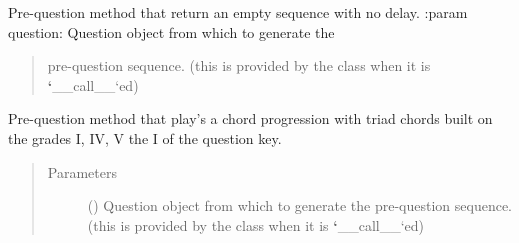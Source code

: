 \documentclass[letterpaper,10pt,english]{sphinxmanual}
\begin{document}

\begin{fulllineitems}
\label{\detokenize{birdears:birdears.prequestion.none}}
Pre-question method that return an empty sequence with no delay.
:param question: Question object from which to generate the
\begin{quote}

pre-question sequence. (this is provided by the  class
when it is {\color{red}\bfseries{}{}`}\_\_call\_\_{}`ed)
\end{quote}
\begin{quote}\begin{description}
\end{description}\end{quote}

\end{fulllineitems}


\begin{fulllineitems}
\label{\detokenize{birdears:birdears.prequestion.progression_i_iv_v_i}}
Pre-question method that play’s a chord progression with triad chords
built on the grades I, IV, V the I of the question key.
\begin{quote}\begin{description}
\item[{Parameters}] \leavevmode
{} () \textendash{} Question object from which to generate the
pre-question sequence. (this is provided by the  class
when it is {\color{red}\bfseries{}{}`}\_\_call\_\_{}`ed)

\end{description}\end{quote}

\end{fulllineitems}
\end{document}
